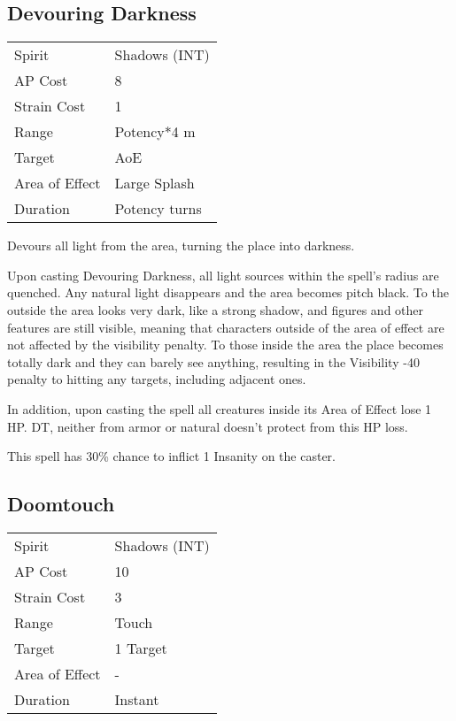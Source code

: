 \documentclass[11pt,a4paper,twocolumn]{book}
\begin{document}


\subsection*{Devouring Darkness}
{
	\begin{tabu} to 75mm{| X[l,4] | X[l,7] |}
		\hline
		Spirit 			& Shadows (INT) 	\\
		AP Cost	      	& 8 				\\
		Strain Cost     & 1 				\\
		Range     		& Potency*4 m		\\
		Target      	& AoE				\\
		Area of Effect  & Large Splash  	 	\\
		Duration     	& Potency turns 	\\ \hline
	\end{tabu}
	
}

\medskip

Devours all light from the area, turning the place into darkness.

Upon casting Devouring Darkness, all light sources within the spell's radius are quenched. Any natural light disappears and the area becomes pitch black. To the outside the area looks very dark, like a strong shadow, and figures and other features are still visible, meaning that characters outside of the area of effect are not affected by the visibility penalty. To those inside the area the place becomes totally dark and they can barely see anything, resulting in the Visibility -40 penalty to hitting any targets, including adjacent ones.

In addition, upon casting the spell all creatures inside its Area of Effect lose 1 HP. DT, neither from armor or natural doesn't protect from this HP loss.

This spell has 30\% chance to inflict 1 Insanity on the caster.


\subsection*{Doomtouch}
{
	\begin{tabu} to 75mm{| X[l,4] | X[l,7] |}
		\hline
		Spirit         & Shadows (INT) \\
		AP Cost        & 10            \\
		Strain Cost    & 3             \\
		Range          & Touch         \\
		Target         & 1 Target      \\
		Area of Effect & -             \\
		Duration       & Instant       \\ \hline
	\end{tabu}
	
}
\end{document}

